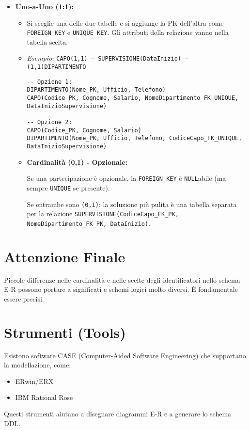 \begin{itemize}
\begin{itemize}
			\item \textbf{Uno-a-Uno (1:1):}
			\begin{itemize}
				\item Si sceglie una delle due tabelle e si aggiunge la PK dell'altra come \texttt{FOREIGN KEY} e \texttt{UNIQUE KEY}. Gli attributi della relazione vanno nella tabella scelta.
				\item \textit{Esempio:} \texttt{CAPO(1,1) --- SUPERVISIONE(DataInizio) --- (1,1)DIPARTIMENTO}
				\begin{verbatim}
-- Opzione 1:
DIPARTIMENTO(Nome_PK, Ufficio, Telefono)
CAPO(Codice_PK, Cognome, Salario, NomeDipartimento_FK_UNIQUE, DataInizioSupervisione)

-- Opzione 2:
CAPO(Codice_PK, Cognome, Salario)
DIPARTIMENTO(Nome_PK, Ufficio, Telefono, CodiceCapo_FK_UNIQUE, DataInizioSupervisione)
				\end{verbatim}
				\item \textbf{Cardinalità (0,1) - Opzionale:}
				
				Se una partecipazione è opzionale, la \texttt{FOREIGN KEY} è \texttt{NULL}abile (ma sempre \texttt{UNIQUE} se presente).
				
				Se entrambe sono \texttt{(0,1)}: la soluzione più pulita è una tabella separata per la relazione \texttt{SUPERVISIONE(CodiceCapo\_FK\_PK, NomeDipartimento\_FK\_PK, DataInizio)}.
			\end{itemize}
		\end{itemize}
	\end{itemize}
	
	\section{Attenzione Finale}
	Piccole differenze nelle cardinalità e nelle scelte degli identificatori nello schema E-R possono portare a significati e schemi logici molto diversi. È fondamentale essere precisi.
	
	\section{Strumenti (Tools)}
	Esistono software CASE (Computer-Aided Software Engineering) che supportano la modellazione, come:
	\begin{itemize}
		\item ERwin/ERX
		\item IBM Rational Rose
	\end{itemize}
	Questi strumenti aiutano a disegnare diagrammi E-R e a generare lo schema DDL.
	

